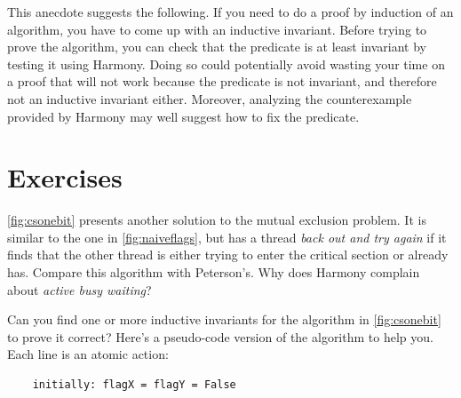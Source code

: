 \documentclass{report}
\newenvironment{code}{
\tcolorbox
}{
\endtcolorbox
}
\begin{document}
This anecdote suggests the following.  If you need to do a proof by induction
of an algorithm, you have to come up with an inductive invariant.
Before trying to prove the algorithm, you can check that the predicate is
at least invariant by testing it using Harmony.  Doing so could potentially
avoid wasting your time on a proof that will not work because the
predicate is not invariant, and therefore not an inductive invariant either.
Moreover, analyzing the counterexample provided by Harmony may well
suggest how to fix the predicate.

\section*{Exercises}
\begin{problems}
\item \autoref{fig:csonebit} presents another solution to the
mutual exclusion problem.  It is similar to the one in
\autoref{fig:naiveflags}, but has a thread \emph{back out and try again}
if it finds that the other thread is either trying to enter the critical
section or already has.  Compare this algorithm with Peterson's.
Why does Harmony complain about \emph{active busy waiting}?
\item
Can you find one or more inductive invariants for the algorithm in
\autoref{fig:csonebit} to prove it correct?
Here's a pseudo-code version of the algorithm to help you.  Each line
is an atomic action:
\begin{code}
\begin{verbatim}
    initially: flagX = flagY = False


\end{verbatim}
\end{code}
\end{problems}
\end{document}
